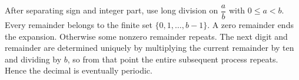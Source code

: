 After separating sign and integer part, use long division on $\dfrac{a}{b}$ with $0\le a<b$. Every remainder belongs to the finite set $\{0,1,\ldots,b-1\}$. A zero remainder ends the expansion. Otherwise some nonzero remainder repeats. The next digit and remainder are determined uniquely by multiplying the current remainder by ten and dividing by $b$, so from that point the entire subsequent process repeats. Hence the decimal is eventually periodic.
